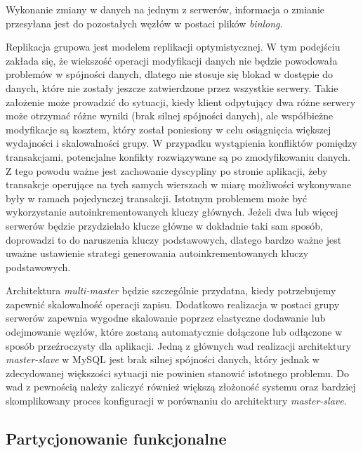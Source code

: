 Wykonanie zmiany w danych na jednym z serwerów, informacja o zmianie przesyłana jest do pozostałych węzłów w postaci plików \textit{binlong}.

Replikacja grupowa jest modelem replikacji optymistycznej. W tym podejściu zakłada się, że wiekszość operacji modyfikacji danych nie będzie powodowała problemów w spójności danych, dlatego nie stosuje się blokad w dostępie do danych, które nie zostały jeszcze zatwierdzone przez wszystkie serwery. Takie założenie może prowadzić do sytuacji, kiedy klient odpytujący dwa różne serwery może otrzymać różne wyniki (brak silnej spójności danych), ale współbieżne modyfikacje są kosztem, który został poniesiony w celu osiągnięcia większej wydajności i skalowalności grupy. W przypadku wystąpienia konfliktów pomiędzy transakcjami, potencjalne konfikty rozwiązywane są po zmodyfikowaniu danych. Z tego powodu ważne jest zachowanie dyscypliny po stronie aplikacji, żeby transakcje operujące na tych samych wierszach w miarę możliwości wykonywane były w ramach pojedynczej transakcji. Istotnym problemem może być wykorzystanie autoinkrementowanych kluczy głównych. Jeżeli dwa lub więcej serwerów będzie przydzielało klucze główne w dokładnie taki sam sposób, doprowadzi to do naruszenia kluczy podstawowych, dlatego bardzo ważne jest uważne ustawienie strategi generowania autoinkrementowanych kluczy podstawowych.

Architektura \textit{multi-master} będzie szczególnie przydatna, kiedy potrzebujemy zapewnić skalowalność operacji zapisu. Dodatkowo realizacja w postaci grupy serwerów zapewnia wygodne skalowanie poprzez elastyczne dodawanie lub odejmowanie węzłów, które zostaną automatycznie dołączone lub odłączone w sposób przeźroczysty dla aplikacji. Jedną z głównych wad realizacji architektury \textit{master-slave} w MySQL jest brak silnej spójności danych, który jednak w zdecydowanej większości sytuacji nie powinien stanowić istotnego problemu. Do wad z pewnością należy zaliczyć również większą złożoność systemu oraz bardziej skomplikowany proces konfiguracji w porównaniu do architektury \textit{master-slave}.


\subsection{Partycjonowanie funkcjonalne}

